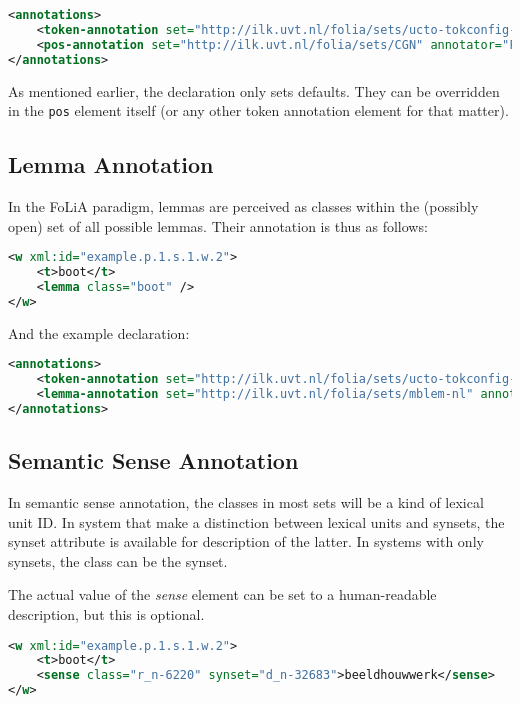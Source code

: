 \documentclass[a4paper,12pt]{report}
\begin{document}
\begin{lstlisting}[language=xml]
<annotations>
    <token-annotation set="http://ilk.uvt.nl/folia/sets/ucto-tokconfig-nl" annotator="ucto" annotatortype="auto" />
    <pos-annotation set="http://ilk.uvt.nl/folia/sets/CGN" annotator="Frog" annotatortype="auto" />
</annotations>
\end{lstlisting}

As mentioned earlier, the declaration only sets defaults. They can be overridden in the \texttt{pos} element itself (or any other token annotation element for that matter).

\subsection{Lemma Annotation}

In the FoLiA paradigm, lemmas are perceived as classes within the (possibly open) set of all possible lemmas. Their annotation is thus as follows:

\begin{lstlisting}[language=xml]
<w xml:id="example.p.1.s.1.w.2">
    <t>boot</t>
    <lemma class="boot" />
</w>
\end{lstlisting}

And the example declaration:

\begin{lstlisting}[language=xml]
<annotations>
    <token-annotation set="http://ilk.uvt.nl/folia/sets/ucto-tokconfig-nl" annotator="ucto" annotatortype="auto" />
    <lemma-annotation set="http://ilk.uvt.nl/folia/sets/mblem-nl" annotator="Frog" annotatortype="auto" />
</annotations>
\end{lstlisting}


\subsection{Semantic Sense Annotation}

In semantic sense annotation, the classes in most sets will be a kind of lexical unit ID. In system that make a distinction between lexical units and synsets, the synset attribute is available for description of the latter. In systems with only synsets, the class can be the synset.

The actual value of the \emph{sense} element can be set to a human-readable description, but this is optional.

\begin{lstlisting}[language=xml]
<w xml:id="example.p.1.s.1.w.2">
    <t>boot</t>
    <sense class="r_n-6220" synset="d_n-32683">beeldhouwwerk</sense>
</w>
\end{lstlisting}
\end{document}
